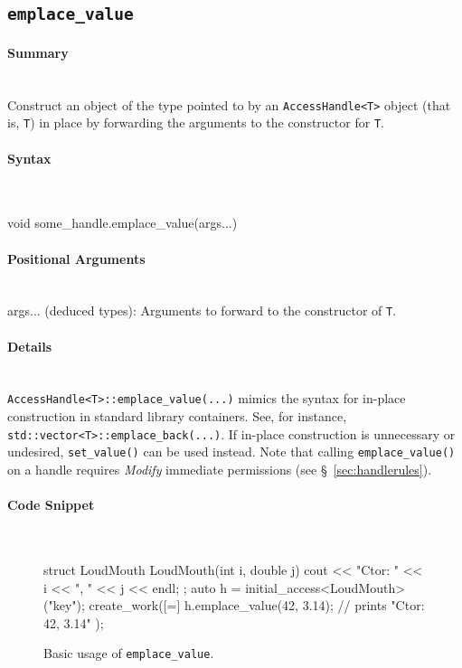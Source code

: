 \subsection{\texttt{emplace\_value}}
\label{ssec:api_fe_emplace_value}

\paragraph{Summary}\mbox{}\\ 
Construct an object of the type pointed to by an \texttt{AccessHandle<T>} object
(that is, \texttt{T}) in place by forwarding the arguments to the constructor
for \texttt{T}.

\paragraph{Syntax}\mbox{}\\ 
\begin{CppCode}
void some_handle.emplace_value(args...)
\end{CppCode}

\paragraph{Positional Arguments}\mbox{}\\ 
args... (deduced types):  Arguments to forward to the constructor of
\texttt{T}.

\paragraph{Details}\mbox{}\\ 

\texttt{AccessHandle<T>::emplace\_value(...)} mimics the syntax for in-place
construction in standard library containers.  See, for instance,
\texttt{std::vector<T>::emplace\_back(...)}.  If in-place construction is
unnecessary or undesired, \texttt{set\_value()} can be used instead.  Note that
calling \texttt{emplace\_value()} on a handle requires {\it Modify} immediate
permissions (see \S~\ref{sec:handlerules}).

\paragraph{Code Snippet}\mbox{}\\ 
\begin{figure}[!h]
\begin{CppCodeNumb}
struct LoudMouth {
  LoudMouth(int i, double j) { cout << "Ctor: " << i << ", " << j << endl; }
};
auto h = initial_access<LoudMouth>("key");
create_work([=]{
  h.emplace_value(42, 3.14); // prints "Ctor: 42, 3.14" 
});
\end{CppCodeNumb}
\label{fig:fe_api_initialaccess}
\caption{Basic usage of \texttt{emplace\_value}.}
\end{figure}

